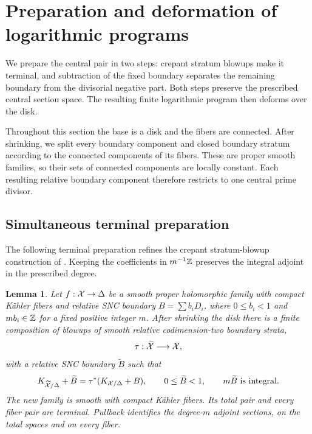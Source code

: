 \documentclass[11pt,a4paper]{article}
\numberwithin{equation}{section}
\newtheorem{lemma}[theorem]{Lemma}
\theoremstyle{definition}
\theoremstyle{remark}
\begin{document}
\section{Preparation and deformation of logarithmic programs}
\label{sec:relative-reduction}

We prepare the central pair in two steps: crepant stratum blowups
make it terminal, and subtraction of the fixed boundary separates
the remaining boundary from the divisorial negative part. Both
steps preserve the prescribed central section space. The resulting
finite logarithmic program then deforms over the disk.

Throughout this section the base is a disk and the fibers are
connected. After shrinking, we split every boundary component and
closed boundary stratum according to the connected components of
its fibers. These are proper smooth families, so their sets of
connected components are locally constant. Each resulting relative
boundary component therefore restricts to one central prime divisor.

\subsection{Simultaneous terminal preparation}

The following terminal preparation refines the crepant
stratum-blowup construction of \cite[Section~4.2]{LW2026}.
Keeping the coefficients in $m^{-1}\mathbb Z$ preserves the integral
adjoint in the prescribed degree.

\begin{lemma}\label{lem:terminal-prep}
Let $f:\mathcal X\to\Delta$ be a smooth proper holomorphic family with
compact Kähler fibers and relative SNC boundary
$B=\sum b_iD_i$, where $0\le b_i<1$ and $mb_i\in\mathbb Z$ for a fixed
positive integer $m$. After shrinking the disk there is a finite
composition of blowups of smooth relative codimension-two boundary
strata,
\[
 \tau:\widetilde{\mathcal X}\longrightarrow\mathcal X,
\]
with a relative SNC boundary $\widetilde B$ such that
\begin{equation}\label{eq:terminal-preparation}
 K_{\widetilde{\mathcal X}/\Delta}+\widetilde B
 =\tau^*(K_{\mathcal X/\Delta}+B),\qquad
 0\le\widetilde B<1,
 \qquad m\widetilde B\text{ is integral}.
\end{equation}
The new family is smooth with compact Kähler fibers. Its total pair
and every fiber pair are terminal. Pullback identifies the degree-$m$
adjoint sections, on the total spaces and on every fiber.
\end{lemma}
\end{document}

